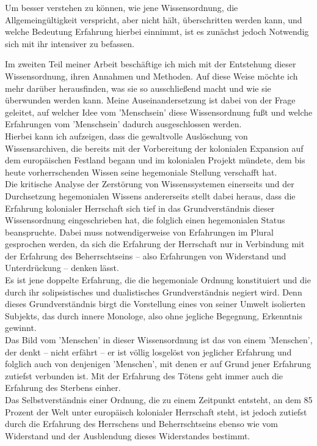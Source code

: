 Um besser verstehen zu können, wie jene Wissensordnung, die Allgemeingültigkeit
verspricht, aber nicht hält, überschritten werden kann, und welche Bedeutung
Erfahrung hierbei einnimmt, ist es zunächst jedoch Notwendig sich mit ihr
intensiver zu befassen. 

Im zweiten Teil meiner Arbeit beschäftige ich mich mit
der Entstehung dieser Wissensordnung, ihren Annahmen und Methoden. Auf diese
Weise möchte ich mehr darüber herausfinden, was sie so ausschließend macht und
wie sie überwunden werden kann. Meine Auseinandersetzung ist dabei von der Frage
geleitet, auf welcher Idee vom 'Menschsein' diese Wissensordnung fußt und welche
Erfahrungen vom 'Menschsein' dadurch ausgeschlossen werden.\\
 Hierbei kann ich
aufzeigen, dass die gewaltvolle Auslöschung von Wissensarchiven, die bereits mit
der Vorbereitung der kolonialen Expansion auf dem europäischen Festland begann
und im kolonialen Projekt mündete, dem bis heute vorherrschenden Wissen seine
hegemoniale Stellung verschafft hat. \\
Die kritische Analyse der Zerstörung von
Wissenssystemen einerseits und der Durchsetzung hegemonialen Wissens
andererseits stellt dabei heraus, dass die Erfahrung kolonialer Herrschaft sich
tief in das Grundverständnis dieser Wissensordnung eingeschrieben hat, die
folglich einen hegemonialen Status beanspruchte. Dabei muss notwendigerweise von
Erfahrungen im Plural gesprochen werden, da sich die Erfahrung der Herrschaft
nur in Verbindung mit der Erfahrung des Beherrschtseins – also Erfahrungen von
Widerstand und Unterdrückung – denken lässt.\\
 Es ist jene doppelte Erfahrung, die
die hegemoniale Ordnung konstituiert und die durch ihr solipsistisches und
dualistisches Grundverständnis negiert wird. Denn dieses Grundverständnis birgt
die Vorstellung eines von seiner Umwelt isolierten Subjekts, das durch innere
Monologe, also ohne jegliche Begegnung, Erkenntnis gewinnt.
\\
Das Bild vom
'Menschen' in dieser Wissensordnung ist das von einem 'Menschen', der denkt –
nicht erfährt – er ist völlig losgelöst von jeglicher Erfahrung und folglich
auch von denjenigen 'Menschen', mit denen er auf Grund jener Erfahrung zutiefst
verbunden ist. Mit der Erfahrung des Tötens geht immer auch die Erfahrung des
Sterbens einher. \\
Das Selbstverständnis einer Ordnung, die zu einem Zeitpunkt
entsteht, an dem 85 Prozent der Welt unter europäisch kolonialer Herrschaft
steht, ist jedoch zutiefst durch die Erfahrung des Herrschens und
Beherrschtseins ebenso wie vom Widerstand und der Ausblendung dieses
Widerstandes bestimmt.

